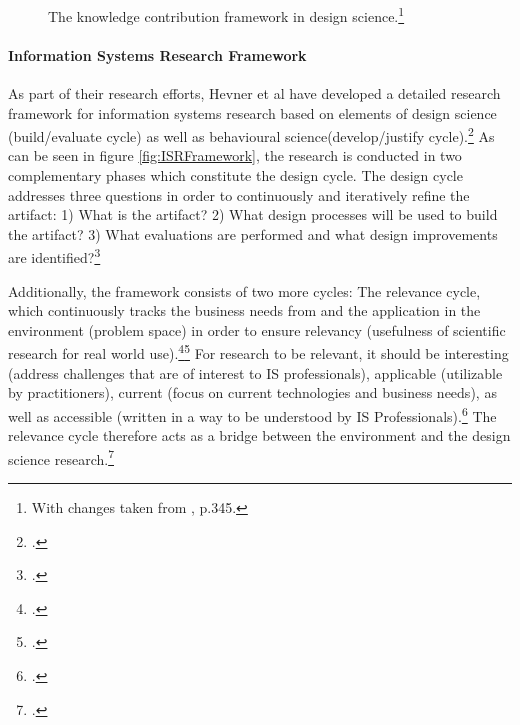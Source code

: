 \begin{figure}
    \centering
    
    \caption[The knowledge contribution framework in design science.]{The knowledge contribution framework in design science.\footnote{With changes taken from \cite{GregorPositioningpresentingdesign2013}, p.345.}}
    \label{fig:DSRKnowledgeContribution}
\end{figure}

\paragraph{Information Systems Research Framework}  \label{topic:design cycle}
As part of their research efforts, Hevner et al have developed a detailed research framework for information systems research based on elements of design science (build/evaluate cycle) as well as behavioural science(develop/justify cycle).\footcite[Cf.][pp.80 et seq]{HevnerDesignScienceResearch2004}
As can be seen in figure \ref{fig:ISRFramework}, the research is conducted in two complementary phases which constitute the design cycle. The design cycle addresses three questions in order to continuously and iteratively refine the artifact: 1) What is the artifact? 2) What design processes will be used to build the artifact? 3) What evaluations are performed and what design improvements are identified?\footcites[Cf.][p.19]{HevnerDesignResearchInformation2010}[cf.][p.90]{Hevnerthreecycleview2007}[cf.][p.89]{Hevnerthreecycleview2007}

 \label{topic:relevance cycle}
Additionally, the framework consists of two more cycles: The relevance cycle, which continuously tracks the business needs from and the application in the environment (problem space) in order to ensure relevancy (usefulness of scientific research for real world use).\footcites[Cf.][p.70]{Simonsciencesartificial1996}[cf.][p.79]{HevnerDesignScienceResearch2004}\footcite[Cf.][p.129]{ThomasBekannteundweniger2014} For research to be relevant, it should be interesting (address challenges that are of interest to IS professionals), applicable (utilizable by practitioners), current (focus on current technologies and business needs), as well as accessible (written in a way to be understood by IS Professionals).\footcite[Cf.][p.5]{BenbasatEmpiricalresearchinformation1999} The relevance cycle therefore acts as a bridge between the environment and the design science research.\footcite[Cf.][p.89]{Hevnerthreecycleview2007} 

